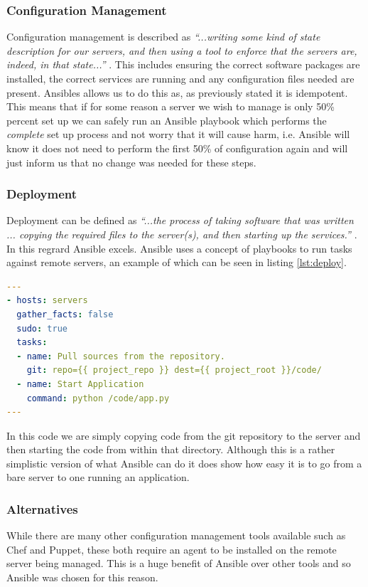 \documentclass{article}
\begin{document}
\subsubsection{Configuration Management}
Configuration management is described as \textit{``...writing some kind of state description for our servers, and then using a tool to enforce that the servers are, indeed, in that state...''} \citep{Hochstein2015}. This includes ensuring the correct software packages are installed, the correct services are running and any configuration files needed are present. Ansibles allows us to do this as, as previously stated it is idempotent. This means that if for some reason a server we wish to manage is only 50\% percent set up we can safely run an Ansible playbook which performs the \textit{complete} set up process and not worry that it will cause harm, i.e. Ansible will know it does not need to perform the first 50\% of configuration again and will just inform us that no change was needed for these steps.

\subsubsection{Deployment}
Deployment can be defined as \textit{``...the process of taking software that was written ... copying the required files to the server(s), and then starting up the services.''} \citep{Hochstein2015}. In this regrard Ansible excels. Ansible uses a concept of playbooks to run tasks against remote servers, an example of which can be seen in listing \ref{lst:deploy}.

\begin{lstlisting}[float,floatplacement=!htbp,language=yaml,caption={A Simple Playbook To Deploy and Run Code},label={lst:deploy},basicstyle=\scriptsize]
---
- hosts: servers
  gather_facts: false
  sudo: true
  tasks:
  - name: Pull sources from the repository.
    git: repo={{ project_repo }} dest={{ project_root }}/code/
  - name: Start Application
    command: python /code/app.py
---
\end{lstlisting}

In this code we are simply copying code from the git repository to the server and then starting the code from within that directory. Although this is a rather simplistic version of what Ansible can do it does show how easy it is to go from a bare server to one running an application.


\subsubsection{Alternatives}
\label{subs:Ansible-alt}
While there are many other configuration management tools available such as Chef and Puppet, these both require an agent to be installed on the remote server being managed. This is a huge benefit of Ansible over other tools and so Ansible was chosen for this reason. 
\end{document}
